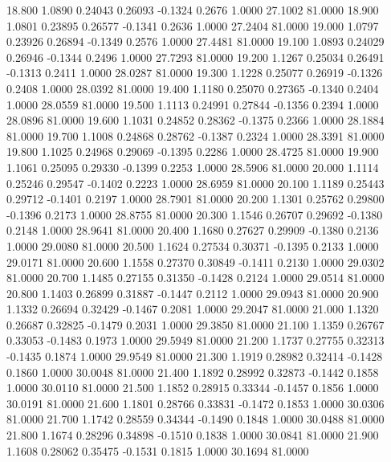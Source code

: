  18.800   1.0890   0.24043   0.26093  -0.1324   0.2676   1.0000  27.1002  81.0000
  18.900   1.0801   0.23895   0.26577  -0.1341   0.2636   1.0000  27.2404  81.0000
  19.000   1.0797   0.23926   0.26894  -0.1349   0.2576   1.0000  27.4481  81.0000
  19.100   1.0893   0.24029   0.26946  -0.1344   0.2496   1.0000  27.7293  81.0000
  19.200   1.1267   0.25034   0.26491  -0.1313   0.2411   1.0000  28.0287  81.0000
  19.300   1.1228   0.25077   0.26919  -0.1326   0.2408   1.0000  28.0392  81.0000
  19.400   1.1180   0.25070   0.27365  -0.1340   0.2404   1.0000  28.0559  81.0000
  19.500   1.1113   0.24991   0.27844  -0.1356   0.2394   1.0000  28.0896  81.0000
  19.600   1.1031   0.24852   0.28362  -0.1375   0.2366   1.0000  28.1884  81.0000
  19.700   1.1008   0.24868   0.28762  -0.1387   0.2324   1.0000  28.3391  81.0000
  19.800   1.1025   0.24968   0.29069  -0.1395   0.2286   1.0000  28.4725  81.0000
  19.900   1.1061   0.25095   0.29330  -0.1399   0.2253   1.0000  28.5906  81.0000
  20.000   1.1114   0.25246   0.29547  -0.1402   0.2223   1.0000  28.6959  81.0000
  20.100   1.1189   0.25443   0.29712  -0.1401   0.2197   1.0000  28.7901  81.0000
  20.200   1.1301   0.25762   0.29800  -0.1396   0.2173   1.0000  28.8755  81.0000
  20.300   1.1546   0.26707   0.29692  -0.1380   0.2148   1.0000  28.9641  81.0000
  20.400   1.1680   0.27627   0.29909  -0.1380   0.2136   1.0000  29.0080  81.0000
  20.500   1.1624   0.27534   0.30371  -0.1395   0.2133   1.0000  29.0171  81.0000
  20.600   1.1558   0.27370   0.30849  -0.1411   0.2130   1.0000  29.0302  81.0000
  20.700   1.1485   0.27155   0.31350  -0.1428   0.2124   1.0000  29.0514  81.0000
  20.800   1.1403   0.26899   0.31887  -0.1447   0.2112   1.0000  29.0943  81.0000
  20.900   1.1332   0.26694   0.32429  -0.1467   0.2081   1.0000  29.2047  81.0000
  21.000   1.1320   0.26687   0.32825  -0.1479   0.2031   1.0000  29.3850  81.0000
  21.100   1.1359   0.26767   0.33053  -0.1483   0.1973   1.0000  29.5949  81.0000
  21.200   1.1737   0.27755   0.32313  -0.1435   0.1874   1.0000  29.9549  81.0000
  21.300   1.1919   0.28982   0.32414  -0.1428   0.1860   1.0000  30.0048  81.0000
  21.400   1.1892   0.28992   0.32873  -0.1442   0.1858   1.0000  30.0110  81.0000
  21.500   1.1852   0.28915   0.33344  -0.1457   0.1856   1.0000  30.0191  81.0000
  21.600   1.1801   0.28766   0.33831  -0.1472   0.1853   1.0000  30.0306  81.0000
  21.700   1.1742   0.28559   0.34344  -0.1490   0.1848   1.0000  30.0488  81.0000
  21.800   1.1674   0.28296   0.34898  -0.1510   0.1838   1.0000  30.0841  81.0000
  21.900   1.1608   0.28062   0.35475  -0.1531   0.1815   1.0000  30.1694  81.0000
